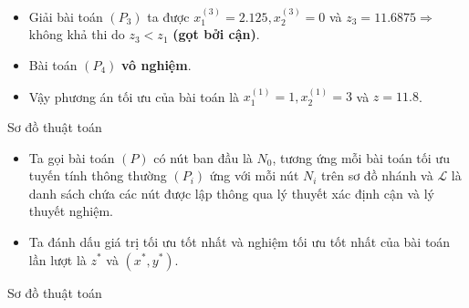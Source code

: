 \documentclass[10pt]{beamer}
\begin{document}
\begin{frame}
    \begin{itemize} 
    \item<1-> Giải bài toán $(P_3)$ ta được $x^{(3)}_1=2.125, x^{(3)}_2=0$ và $z_3=11.6875 \Rightarrow $ không khả thi do $z_3 < z_1$ \textbf{(gọt bởi cận)}. 
    \medskip
    \item<1-> Bài toán $(P_4)$ \textbf{vô nghiệm}.
    \bigskip
    \item<2-> Vậy phương án tối ưu của bài toán là $x^{(1)}_1=1, x^{(1)}_2=3$ và $z=11.8$.
\end{itemize}
\end{frame}

\begin{frame}{Sơ đồ thuật toán}
\begin{itemize}
\item Ta gọi bài toán $(P)$ có nút ban đầu là $N_0$, tương ứng mỗi bài toán tối ưu tuyến tính thông thường $(P_i)$ ứng với mỗi nút $N_i$ trên sơ đồ nhánh và $\mathcal{L}$ là danh sách chứa các nút được lập thông qua lý thuyết xác định cận và lý thuyết nghiệm.
\bigskip
\item Ta đánh dấu giá trị tối ưu tốt nhất và nghiệm tối ưu tốt nhất của bài toán lần lượt là $z^*$ và $(x^*,y^*)$.
\end{itemize}
\end{frame}

\begin{frame}{Sơ đồ thuật toán}
\small
\setlength{\parindent}{4em}
\end{frame}    
\end{document}
